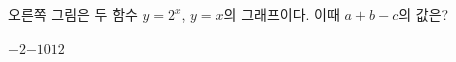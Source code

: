 \noindent\begin{minipage}[t]{0.58\linewidth}\vspace{0pt}\raggedright 오른쪽 그림은 두 함수 $y=2^{x}$, $y=x$의 그래프이다. 이때 $a+b-c$의 값은? \end{minipage}\hfill\begin{minipage}[t]{0.4\linewidth}\vspace{0pt}\centering \resizebox{\ifdim\width>\linewidth\linewidth\else\width\fi}{!}{}\end{minipage}\par
\begin{choicesii}{$-2$}{$-1$}{$0$}{$1$}{$2$}\end{choicesii}
